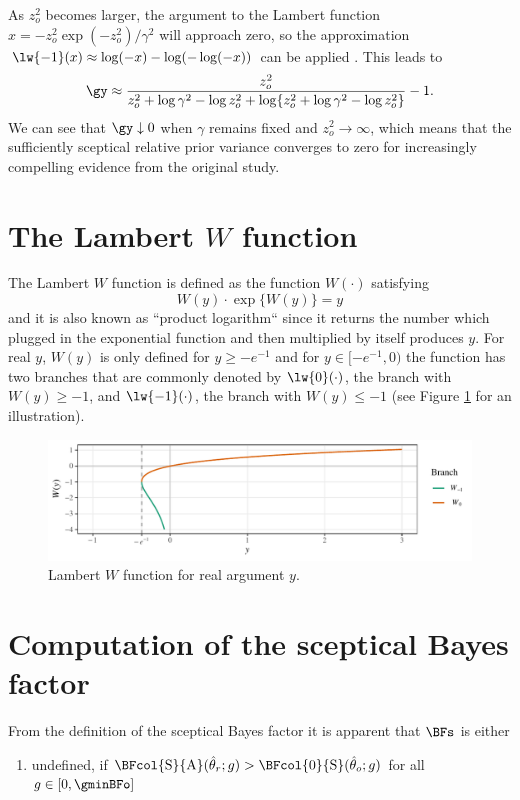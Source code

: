 \begin{subappendices}
As $z_{o}^{2}$ becomes larger, the argument to the Lambert function
$x = -z_{o}^{2}\exp(-z_{o}^{2})/\gamma^{2}$ will approach zero, so the
approximation $\lw{-1}(x) \approx \log(-x) - \log(-\log(-x))$ can be applied
\citep[p. 350]{Corless1996}. This leads to
\begin{align*}
  \gy \approx \frac{z_{o}^{2}}{z_{o}^{2} + \log \gamma^{2} - \log z_{o}^{2} +
  \log\{z_{o}^{2} + \log \gamma^{2} - \log z_{o}^{2}\}} - 1.
\end{align*}
We can see that $\gy \downarrow 0$ when $\gamma$ remains fixed and
$z_{o}^{2} \to \infty$, which means that the sufficiently sceptical relative
prior variance converges to zero for increasingly compelling evidence from the
original study.

\section{The Lambert $W$ function}
\label{appendix:lambertW}
The Lambert $W$ function \citep{Corless1996} is defined as the function
$W(\cdot)$ satisfying
$$W(y) \cdot \exp\{W(y)\} = y$$
and it is also known as ``product logarithm`` since it returns the number which
plugged in the exponential function and then multiplied by itself produces $y$.
For real $y$, $W(y)$ is only defined for $y \geq - e^{-1}$ and for
$y \in [-e^{-1}, 0)$ the function has two branches that are commonly denoted by
$\lw{0}(\cdot)$, the branch with $W(y) \geq -1$, and $\lw{-1}(\cdot)$, the
branch with $W(y) \leq -1$ (see Figure \ref{fig1:lambertW} for an illustration).
\begin{figure}[!htb]
\begin{knitrout}
\color{fgcolor}
\includegraphics[width=\maxwidth]{images/paper1/plot-Lambert-1}
\end{knitrout}
\caption{Lambert $W$ function for real argument $y$.}
\label{fig1:lambertW}
\end{figure}


\section{Computation of the sceptical Bayes factor}
\label{appendix:bfs}
From the definition of the sceptical Bayes factor it is apparent that $\BFs$ is
either
\begin{enumerate}
  \item \label{undef} undefined,
  if
  $\BFcol{\text{S}}{\text{A}}(\hat{\theta}_r; g) >
  \BFcol{\text{0}}{\text{S}}(\hat{\theta}_o; g)$ for all $g \in [0,
    \gminBFo]$


\end{enumerate}
\end{subappendices}

